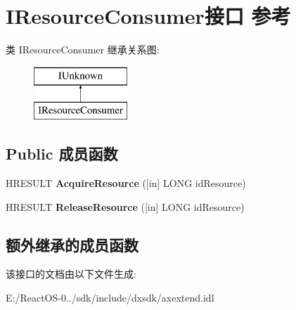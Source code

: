 \hypertarget{interface_i_resource_consumer}{}\section{I\+Resource\+Consumer接口 参考}
\label{interface_i_resource_consumer}
类 I\+Resource\+Consumer 继承关系图\+:\begin{figure}[H]
\begin{center}
\leavevmode
\includegraphics[height=2.000000cm]{interface_i_resource_consumer}
\end{center}
\end{figure}
\subsection*{Public 成员函数}
\begin{DoxyCompactItemize}
\item 
\mbox{\label{interface_i_resource_consumer_a9ee676910113fd7c16cdadae626c16a7}} 
H\+R\+E\+S\+U\+LT {\bfseries Acquire\+Resource} (\mbox{[}in\mbox{]} L\+O\+NG id\+Resource)
\item 
\mbox{\label{interface_i_resource_consumer_abdd7cf9b094c86ca3d88557448ac0a9c}} 
H\+R\+E\+S\+U\+LT {\bfseries Release\+Resource} (\mbox{[}in\mbox{]} L\+O\+NG id\+Resource)
\end{DoxyCompactItemize}
\subsection*{额外继承的成员函数}


该接口的文档由以下文件生成\+:\begin{DoxyCompactItemize}
\item 
E\+:/\+React\+O\+S-\/0../sdk/include/dxsdk/axextend.\+idl\end{DoxyCompactItemize}
